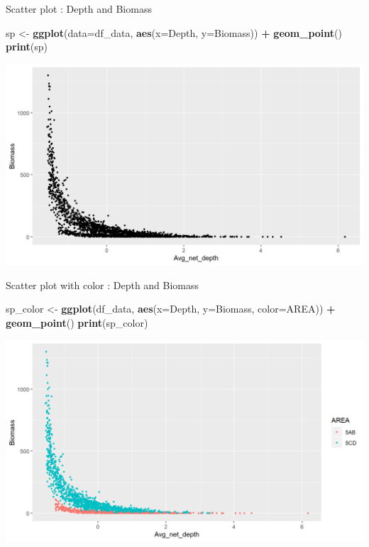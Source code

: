 \documentclass[
  ignorenonframetext,
]{beamer}
\newenvironment{Shaded}{\begin{snugshade}}{\end{snugshade}}
\newcommand{\DataTypeTok}[1]{\textcolor[rgb]{0.13,0.29,0.53}{#1}}
\newcommand{\KeywordTok}[1]{\textcolor[rgb]{0.13,0.29,0.53}{\textbf{#1}}}
\newcommand{\NormalTok}[1]{#1}
\newcommand{\OperatorTok}[1]{\textcolor[rgb]{0.81,0.36,0.00}{\textbf{#1}}}
\newcommand{\StringTok}[1]{\textcolor[rgb]{0.31,0.60,0.02}{#1}}
\begin{document}
\begin{frame}[fragile]{Scatter plot : Depth and Biomass}
\protect\hypertarget{scatter-plot-depth-and-biomass}{}

\begin{Shaded}
\begin{Highlighting}[]
\NormalTok{sp <-}\StringTok{ }\KeywordTok{ggplot}\NormalTok{(}\DataTypeTok{data=}\NormalTok{df_data, }\KeywordTok{aes}\NormalTok{(}\DataTypeTok{x=}\NormalTok{Depth, }\DataTypeTok{y=}\NormalTok{Biomass)) }\OperatorTok{+}
\StringTok{  }\KeywordTok{geom_point}\NormalTok{()}
\KeywordTok{print}\NormalTok{(sp)}
\end{Highlighting}
\end{Shaded}

\begin{center}\includegraphics[width=0.8\linewidth]{figure/sp_base-1} \end{center}

\end{frame}

\begin{frame}[fragile]{Scatter plot with color : Depth and Biomass}
\protect\hypertarget{scatter-plot-with-color-depth-and-biomass}{}

\begin{Shaded}
\begin{Highlighting}[]
\NormalTok{sp_color <-}\StringTok{ }\KeywordTok{ggplot}\NormalTok{(df_data, }\KeywordTok{aes}\NormalTok{(}\DataTypeTok{x=}\NormalTok{Depth, }\DataTypeTok{y=}\NormalTok{Biomass, }\DataTypeTok{color=}\NormalTok{AREA)) }\OperatorTok{+}
\StringTok{  }\KeywordTok{geom_point}\NormalTok{()}
\KeywordTok{print}\NormalTok{(sp_color)}
\end{Highlighting}
\end{Shaded}

\begin{center}\includegraphics[width=0.8\linewidth]{figure/sp_color-1} \end{center}

\end{frame}
\end{document}
